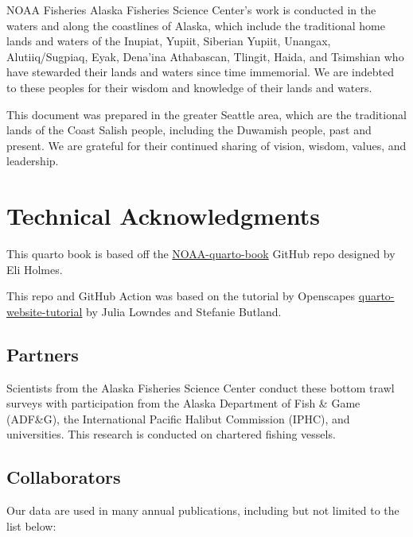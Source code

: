 \documentclass[
  letterpaper,
  oneside,
  open=any]{scrbook}
\begin{document}
NOAA Fisheries Alaska Fisheries Science Center's work is conducted in
the waters and along the coastlines of Alaska, which include the
traditional home lands and waters of the Inupiat, Yupiit, Siberian
Yupiit, Unangax, Alutiiq/Sugpiaq, Eyak, Dena'ina Athabascan, Tlingit,
Haida, and Tsimshian who have stewarded their lands and waters since
time immemorial. We are indebted to these peoples for their wisdom and
knowledge of their lands and waters.

This document was prepared in the greater Seattle area, which are the
traditional lands of the Coast Salish people, including the Duwamish
people, past and present. We are grateful for their continued sharing of
vision, wisdom, values, and leadership.

\hypertarget{technical-acknowledgments}{%
\chapter{Technical Acknowledgments}\label{technical-acknowledgments}}

This quarto book is based off the
\href{https://github.com/nmfs-opensci/NOAA-quarto-book}{NOAA-quarto-book}
GitHub repo designed by Eli Holmes.

This repo and GitHub Action was based on the tutorial by Openscapes
\href{https://github.com/Openscapes/quarto-website-tutorial}{quarto-website-tutorial}
by Julia Lowndes and Stefanie Butland.

\hypertarget{partners}{%
\section{Partners}\label{partners}}

Scientists from the Alaska Fisheries Science Center conduct these bottom
trawl surveys with participation from the Alaska Department of Fish \&
Game (ADF\&G), the International Pacific Halibut Commission (IPHC), and
universities. This research is conducted on chartered fishing vessels.

\hypertarget{collaborators}{%
\section{Collaborators}\label{collaborators}}

Our data are used in many annual publications, including but not limited
to the list below:
\end{document}
